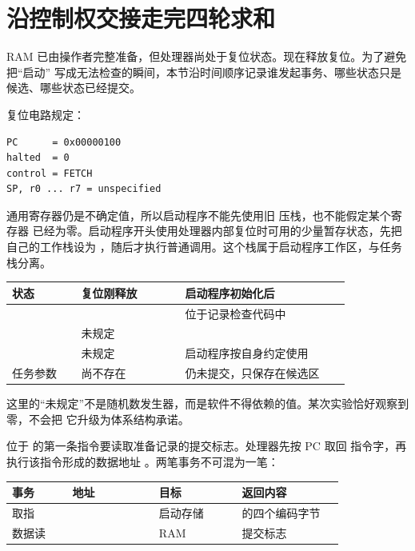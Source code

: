\section{沿控制权交接走完四轮求和}

RAM 已由操作者完整准备，但处理器尚处于复位状态。现在释放复位。为了避免把“启动”
写成无法检查的瞬间，本节沿时间顺序记录谁发起事务、哪些状态只是候选、哪些状态已经提交。


复位电路规定：

\begin{lstlisting}
PC      = 0x00000100
halted  = 0
control = FETCH
SP, r0 ... r7 = unspecified
\end{lstlisting}

通用寄存器仍是不确定值，所以启动程序不能先使用旧  压栈，也不能假定某个寄存器
已经为零。启动程序开头使用处理器内部复位时可用的少量暂存状态，先把自己的工作栈设为
，随后才执行普通调用。这个栈属于启动程序工作区，与任务栈分离。

\begin{longtable}{|L{0.18\linewidth}|L{0.27\linewidth}|L{0.43\linewidth}|}
\hline
{}
状态 & 复位刚释放 & 启动程序初始化后 \\ \hline
{} &  & 位于记录检查代码中 \\ \hline
{} & 未规定 &  \\ \hline
{} & 未规定 & 启动程序按自身约定使用 \\ \hline
任务参数 & 尚不存在 & 仍未提交，只保存在候选区 \\ \hline
\end{longtable}

这里的“未规定”不是随机数发生器，而是软件不得依赖的值。某次实验恰好观察到零，不会把
它升级为体系结构承诺。


位于  的第一条指令要读取准备记录的提交标志。处理器先按 PC 取回
指令字，再执行该指令形成的数据地址 。两笔事务不可混为一笔：

\begin{longtable}{|L{0.16\linewidth}|L{0.23\linewidth}|L{0.22\linewidth}|L{0.27\linewidth}|}
\hline
{}
事务 & 地址 & 目标 & 返回内容 \\ \hline
取指 &  & 启动存储 &  的四个编码字节 \\ \hline
数据读 &  & RAM & 提交标志  \\ \hline
\end{longtable}

